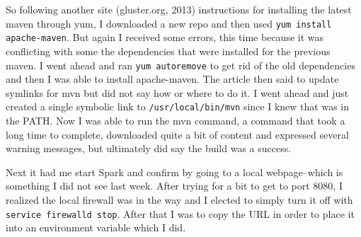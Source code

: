 \documentclass[10pt]{article}
\begin{document}
\par
So following another site (gluster.org, 2013) instructions for installing the latest maven through yum, I downloaded a new repo and then used \verb|yum install apache-maven|. But again I received some errors, this time because it was conflicting with some the dependencies that were installed for the previous maven. I went ahead and ran \verb|yum autoremove| to get rid of the old dependencies and then I was able to install apache-maven. The article then said to update symlinks for mvn but did not say how or where to do it. I went ahead and just created a single symbolic link to \verb|/usr/local/bin/mvn| since I knew that was in the PATH. Now I was able to run the mvn command, a command that took a long time to complete, downloaded quite a bit of content and expressed several warning messages, but ultimately did say the build was a success.
\par
{}%
\hfill
{}%
\par
Next it had me start Spark and confirm by going to a local webpage--which is something I did not see last week. After trying for a bit to get to port 8080, I realized the local firewall was in the way and I elected to simply turn it off with \verb|service firewalld stop|. After that I was to copy the URL in order to place it into an environment variable which I did.
\par
\end{document}
